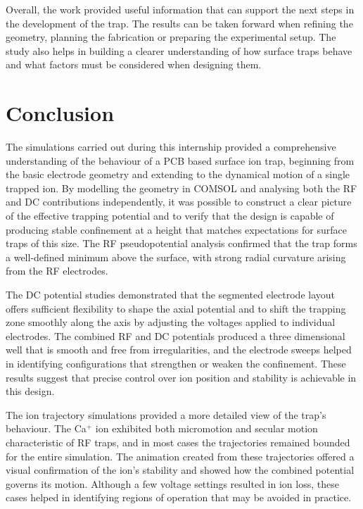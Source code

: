 \documentclass[12pt,a4paper]{report}
\begin{document}
Overall, the work provided useful information that can support the next steps in the development of the trap. The results can be taken forward when refining the geometry, planning the fabrication or preparing the experimental setup. The study also helps in building a clearer understanding of how surface traps behave and what factors must be considered when designing them.

\chapter*{Conclusion}

The simulations carried out during this internship provided a comprehensive understanding of the behaviour of a PCB based surface ion trap, beginning from the basic electrode geometry and extending to the dynamical motion of a single trapped ion. By modelling the geometry in COMSOL and analysing both the RF and DC contributions independently, it was possible to construct a clear picture of the effective trapping potential and to verify that the design is capable of producing stable confinement at a height that matches expectations for surface traps of this size. The RF pseudopotential analysis confirmed that the trap forms a well-defined minimum above the surface, with strong radial curvature arising from the RF electrodes.

The DC potential studies demonstrated that the segmented electrode layout offers sufficient flexibility to shape the axial potential and to shift the trapping zone smoothly along the axis by adjusting the voltages applied to individual electrodes. The combined RF and DC potentials produced a three dimensional well that is smooth and free from irregularities, and the electrode sweeps helped in identifying configurations that strengthen or weaken the confinement. These results suggest that precise control over ion position and stability is achievable in this design.

The ion trajectory simulations provided a more detailed view of the trap’s behaviour. The Ca$^{+}$ ion exhibited both micromotion and secular motion characteristic of RF traps, and in most cases the trajectories remained bounded for the entire simulation. The animation created from these trajectories offered a visual confirmation of the ion’s stability and showed how the combined potential governs its motion. Although a few voltage settings resulted in ion loss, these cases helped in identifying regions of operation that may be avoided in practice.
\end{document}
